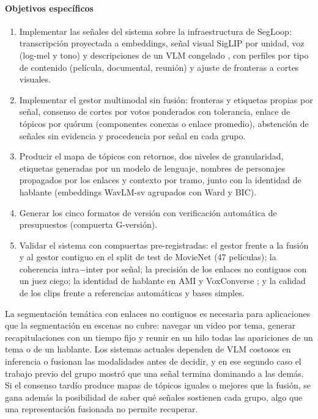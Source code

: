 \paragraph{Objetivos específicos}
\begin{enumerate}
  \item Implementar las señales del sistema sobre la infraestructura de SegLoop:
        transcripción \cite{radford2023whisper} proyectada a embeddings, señal visual
        SigLIP \cite{zhai2023siglip} por unidad, voz (log-mel y tono) y descripciones de un
        VLM congelado \cite{bai2025qwen25vl}, con perfiles por tipo de contenido (película,
        documental, reunión) y ajuste de fronteras a cortes visuales.
  \item Implementar el gestor multimodal sin fusión: fronteras y etiquetas propias por
        señal, consenso de cortes por votos ponderados con tolerancia, enlace de tópicos por
        quórum (componentes conexas o enlace promedio), abstención de señales sin evidencia y
        procedencia por señal en cada grupo.
  \item Producir el mapa de tópicos con retornos, dos niveles de granularidad, etiquetas
        generadas por un modelo de lenguaje, nombres de personajes propagados por los
        enlaces y contexto por tramo, junto con la identidad de hablante (embeddings
        WavLM-sv \cite{chen2022wavlm} agrupados con Ward y BIC).
  \item Generar los cinco formatos de versión con verificación automática de presupuestos
        (compuerta G-versión).
  \item Validar el sistema con compuertas pre-registradas: el gestor frente a la fusión y al
        gestor contiguo en el split de test de MovieNet (47 películas); la coherencia
        intra$-$inter por señal; la precisión de los enlaces no contiguos con un juez ciego;
        la identidad de hablante en AMI \cite{carletta2007ami} y VoxConverse
        \cite{chung2020voxconverse}; y la calidad de los clips frente a referencias
        automáticas y bases simples.
\end{enumerate}


La segmentación temática con enlaces no contiguos es necesaria para aplicaciones que la
segmentación en escenas no cubre: navegar un video por tema, generar recapitulaciones con un
tiempo fijo y reunir en un hilo todas las apariciones de un tema o de un hablante. Los
sistemas actuales dependen de VLM costosos en inferencia \cite{berman2025scenevlm} o
fusionan las modalidades antes de decidir, y en ese segundo caso el trabajo previo del grupo
mostró que una señal termina dominando a las demás. Si el consenso tardío produce mapas de
tópicos iguales o mejores que la fusión, se gana además la posibilidad de saber qué señales
sostienen cada grupo, algo que una representación fusionada no permite recuperar.

